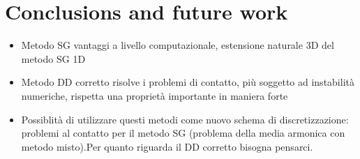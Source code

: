 \chapter{Conclusions and future work}

\begin{itemize}
\item Metodo SG vantaggi a livello computazionale, estensione naturale 3D del metodo SG 1D
\item Metodo DD corretto risolve i problemi di contatto, pi\`u soggetto ad instabilit\`a numeriche, rispetta una propriet\`a importante in maniera forte
\item Possiblit\`a di utilizzare questi metodi come nuovo schema di discretizzazione: problemi al contatto per il metodo SG (problema della media armonica con metodo misto).Per quanto riguarda il DD corretto bisogna pensarci.
\end{itemize}